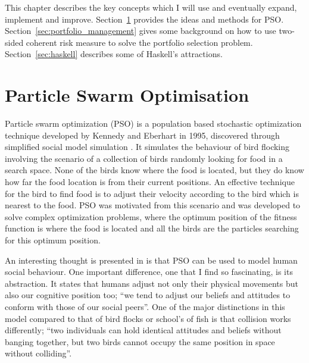 \documentclass{pdfmx4020}
\begin{document}
  This chapter describes the key concepts which I will use and eventually expand, implement and improve. Section~\ref{sec:particle_swarm_optimisation} provides the ideas and methods for PSO. Section~\ref{sec:portfolio_management} gives some background on how to use two-sided coherent risk measure\cite{two_sided_risk} to solve the portfolio selection problem. Section~\ref{sec:haskell} describes some of Haskell's attractions. 


  \section{Particle Swarm Optimisation} %
  \label{sec:particle_swarm_optimisation}


  Particle swarm optimization (PSO) is a population based  stochastic optimization technique developed by Kennedy and  Eberhart in 1995, discovered through simplified social model simulation \cite{pso,pso2,pso3,pso4}. It simulates the behaviour of bird flocking involving the scenario of a collection of birds randomly looking for food in a search space. None of the birds know where the food is located, but they do know how far the food location is from their current positions. An effective technique for the bird to find food is to adjust their velocity according to the bird which is nearest to the food. PSO was motivated from this scenario and was developed to solve complex optimization problems, where the optimum position of the fitness function is where the food is located and all the birds are the particles searching for this optimum position. 

  An interesting thought is presented in \cite{pso} is that PSO can be used to model human social behaviour. One important difference, one that I find so fascinating, is its abstraction. It states that humans adjust not only their physical movements but also our cognitive position too; ``we tend to adjust our beliefs and attitudes to conform with those of our social peers''\cite{pso}. One of the major distinctions in this model compared to that of bird flocks or school's of fish is that collision works differently; ``two individuals can hold identical attitudes and beliefs without banging together, but two birds cannot occupy the same position in space without colliding''.
\end{document}
